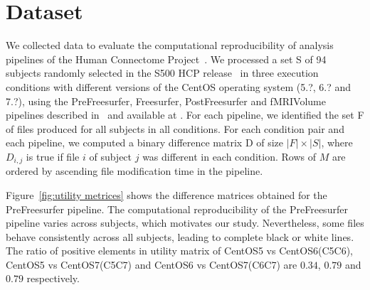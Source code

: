 \documentclass[10pt, conference, compsocconf]{IEEEtran}
\newcommand{\todo}[1]{\marginpar{\parbox{18mm}{\flushleft\tiny\color{red}\textbf{TODO}:
      #1}}}
\begin{document}
\section{Dataset}

We collected data to evaluate the computational reproducibility of analysis
pipelines of the Human Connectome Project~\cite{general-hcp}. We
processed a set S of 94 subjects randomly selected in the S500 HCP
release~\todo{URL} in three execution conditions with different
versions of the CentOS operating system (5.?, 6.? and 7.?), using the
PreFreesurfer, Freesurfer, PostFreesurfer and fMRIVolume pipelines
described in~\cite{hcp-pipelines} and available at \todo{URL}. For
each pipeline, we identified the set F of files produced for all
subjects in all conditions. For each condition pair and each pipeline,
we computed a binary difference matrix D of size $|F|\times|S|$, where $D_{i,j}$ is true
if file $i$ of subject $j$ was different in each condition. Rows of
$M$ are ordered by ascending file modification time in the pipeline.

Figure~\ref{fig:utility metrices} shows the difference matrices
obtained for the PreFreesurfer pipeline. The computational
reproducibility of the PreFreesurfer pipeline varies across subjects,
which motivates our study. Nevertheless, some files behave
consistently across all subjects, leading to complete black or white
lines. The ratio of positive elements in utility matrix of CentOS5 vs CentOS6(C5C6),  CentOS5 vs CentOS7(C5C7) and  CentOS6 vs CentOS7(C6C7) are
$0.34$, $0.79$ and $0.79$ respectively.
\end{document}
